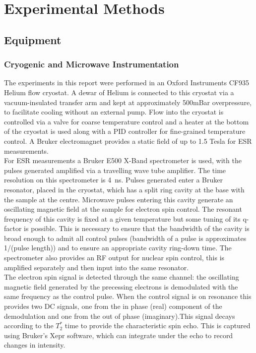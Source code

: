 \chapter{Experimental Methods}


\section{Equipment}
\subsection{Cryogenic and Microwave Instrumentation}

The experiments in this report were performed in an Oxford Instruments CF935 Helium flow cryostat.
A dewar of Helium is connected to this cryostat via a vacuum-insulated transfer arm and kept at approximately 500mBar overpressure, to facilitate cooling without an external pump.
Flow into the cryostat is controlled via a valve for coarse temperature control and a heater at the bottom of the cryostat is used along with a PID controller for fine-grained temperature control.
A Bruker electromagnet provides a static field of up to 1.5 Tesla for ESR measurements.
\\
For ESR measurements a Bruker E500 X-Band spectrometer is used, with the pulses generated amplified via a travelling wave tube amplifier.
The time resolution on this spectrometer is 4~ns.
Pulses generated enter a Bruker resonator, placed in the cryostat, which has a split ring cavity at the base with the sample at the centre.
Microwave pulses entering this cavity generate an oscillating magnetic field at the sample for electron spin control. 
The resonant frequency of this cavity is fixed at a given temperature but some tuning of its q-factor is possible.
This is necessary to ensure that the bandwidth of the cavity is broad enough to admit all control pulses (bandwidth of a pulse is approximates 1/(pulse length)) and to ensure an appropriate cavity ring-down time.
The spectrometer also provides an RF output for nuclear spin control, this is amplified separately and then input into the same resonator.
\\
The electron spin signal is detected through the same channel: the oscillating magnetic field generated by the precessing electrons is demodulated with the same frequency as the control pulse.
When the control signal is on resonance this provides two DC signals, one from the in phase (real) component of the demodulation and one from the out of phase (imaginary).This signal decays according to the $T_2^*$ time to provide the characteristic spin echo.
This is captured using Bruker's Xepr software, which can integrate under the echo to record changes in intensity.

